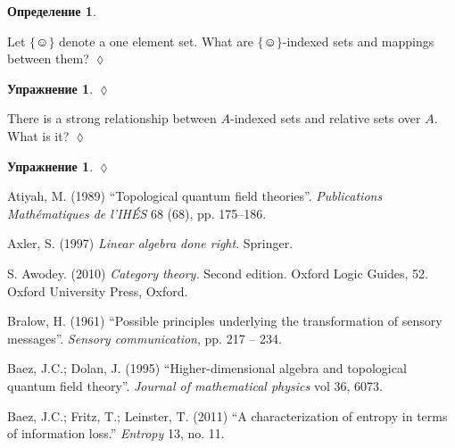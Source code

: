 \documentclass[a4paper]{book}
\def\singleton{\{\smiley\}}
\def\rr{\raggedright}
\theoremstyle{myth}
\newtheorem{excENG}[envENG]{\begin{english}Exercise\end{english}}
\newenvironment{exerciseENG}{\begin{excENG}}{\hspace*{\fill}$\lozenge$\end{excENG}}
\newtheorem{excRUS}[envRUS]{Упражнение}
\newtheorem{definitionRUS}[envRUS]{Определение}
\newenvironment{exerciseRUS}{\begin{excRUS}}{\hspace*{\fill}$\lozenge$\end{excRUS}}
\begin{document}
\begin{russian}
\begin{definitionRUS}\label{def:indexed sets}
 
\end{definitionRUS}

\begin{exerciseENG}
Let $\singleton$ denote a one element set. What are $\singleton$-indexed sets and mappings between them?
\end{exerciseENG}

\begin{exerciseRUS}
 
\end{exerciseRUS}

\begin{exerciseENG}
There is a strong relationship between $A$-indexed sets and relative sets over $A$. What is it?
\end{exerciseENG}

\begin{exerciseRUS}
 
\end{exerciseRUS}


\printendnotes[custom]


\printindex



\begin{thebibliography}{SGWB}\rr

 Atiyah, M. (1989) “Topological quantum field theories”. {\em Publications Math\'{e}matiques de l'IH\'{E}S} 68 (68), pp. 175--186.

 Axler, S. (1997) {\em Linear algebra done right}. Springer. 

 S. Awodey. (2010) {\em Category theory.} Second edition. Oxford Logic Guides, 52. Oxford University Press, Oxford.

 Bralow, H. (1961) “Possible principles underlying the transformation of sensory messages”. {\em Sensory communication}, pp. 217 -- 234.

 Baez, J.C.; Dolan, J. (1995) “Higher-dimensional algebra and topological quantum field theory”. {\em Journal of mathematical physics} vol 36, 6073.

 Baez, J.C.; Fritz, T.; Leinster, T. (2011) “A characterization of entropy in terms of information loss.” {\em Entropy} 13, no. 11.


\end{thebibliography}
\end{russian}
\end{document}
